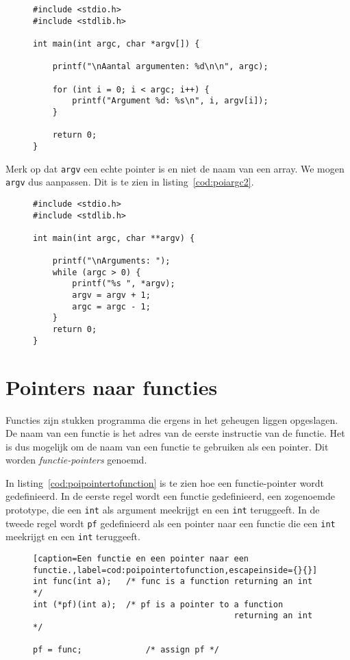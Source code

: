 \begin{figure}[!ht]
\begin{lstlisting}[caption=Het programma myprog.exe.,label=cod:myprogexe]
#include <stdio.h>
#include <stdlib.h>

int main(int argc, char *argv[]) {

    printf("\nAantal argumenten: %d\n\n", argc);
    
    for (int i = 0; i < argc; i++) {
        printf("Argument %d: %s\n", i, argv[i]);
    }
    
    return 0;
}
\end{lstlisting}
\end{figure}

Merk op dat \texttt{argv} een echte pointer is en niet de naam van een array. We mogen \texttt{argv} dus aanpassen. Dit is te zien in listing~\ref{cod:poiargc2}.

\begin{figure}[!ht]
\begin{lstlisting}[caption=Afdrukken van argumenten.,label=cod:poiargc2]
#include <stdio.h>
#include <stdlib.h>

int main(int argc, char **argv) {

    printf("\nArguments: ");
    while (argc > 0) {
        printf("%s ", *argv);
        argv = argv + 1;
        argc = argc - 1;
    }
    return 0;
}
\end{lstlisting}
\end{figure}


\section{Pointers naar functies}
\label{sec:pointersnaarfunctie}
Functies zijn stukken programma die ergens in het geheugen liggen opgeslagen. De naam van een functie is het adres van de eerste instructie van de functie. Het is dus mogelijk om de naam van een functie te gebruiken als een pointer. Dit worden \textsl{functie-pointers} genoemd.

In listing~\ref{cod:poipointertofunction} is te zien hoe een functie-pointer wordt gedefinieerd. In de eerste regel wordt een functie gedefinieerd, een zogenoemde prototype, die een \texttt{int} als argument meekrijgt en een \texttt{int} teruggeeft. In de tweede regel wordt \texttt{pf} gedefinieerd als een pointer naar een functie die een \texttt{int} meekrijgt en een \texttt{int} teruggeeft.

\begin{figure}[!ht]
\begin{lstlisting}[caption=Een functie en een pointer naar een functie.,label=cod:poipointertofunction,escapeinside={}{}]
int func(int a);   /* func is a function returning an int */
int (*pf)(int a);  /* pf is a pointer to a function
                                         returning an int */

pf = func;             /* assign pf */
\end{lstlisting}
\end{figure}

